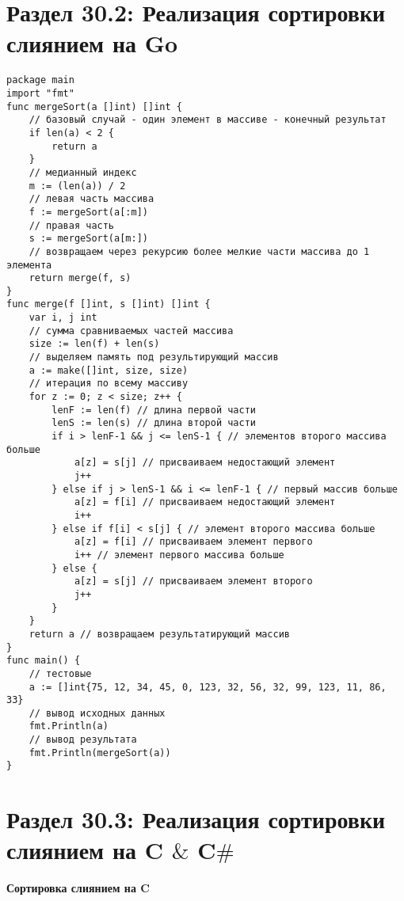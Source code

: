 \section*{Раздел 30.2: Реализация сортировки слиянием на Go}
\begin{tcolorbox}
\begin{verbatim}
package main
import "fmt"
func mergeSort(a []int) []int {
	// базовый случай - один элемент в массиве - конечный результат
	if len(a) < 2 {
		return a
	}
	// медианный индекс
	m := (len(a)) / 2
	// левая часть массива
	f := mergeSort(a[:m])
	// правая часть
	s := mergeSort(a[m:])
	// возвращаем через рекурсию более мелкие части массива до 1 элемента
	return merge(f, s)
}
func merge(f []int, s []int) []int {
	var i, j int
	// сумма сравниваемых частей массива
	size := len(f) + len(s)
	// выделяем память под результирующий массив
	a := make([]int, size, size)
	// итерация по всему массиву
	for z := 0; z < size; z++ {
		lenF := len(f) // длина первой части
		lenS := len(s) // длина второй части
		if i > lenF-1 && j <= lenS-1 { // элементов второго массива больше
			a[z] = s[j] // присваиваем недостающий элемент
			j++ 
		} else if j > lenS-1 && i <= lenF-1 { // первый массив больше
			a[z] = f[i] // присваиваем недостающий элемент
			i++ 
		} else if f[i] < s[j] { // элемент второго массива больше
			a[z] = f[i] // присваиваем элемент первого
			i++ // элемент первого массива больше
		} else { 
			a[z] = s[j] // присваиваем элемент второго
			j++
		}
	}
	return a // возвращаем результатирующий массив
}
func main() {
	// тестовые 
	a := []int{75, 12, 34, 45, 0, 123, 32, 56, 32, 99, 123, 11, 86, 33}
	// вывод исходных данных
	fmt.Println(a)
	// вывод результата
	fmt.Println(mergeSort(a))
}
\end{verbatim}
\end{tcolorbox}
\section*{Раздел 30.3: Реализация сортировки слиянием на C $\&$ C$\#$}
\textbf{Сортировка слиянием на C}

